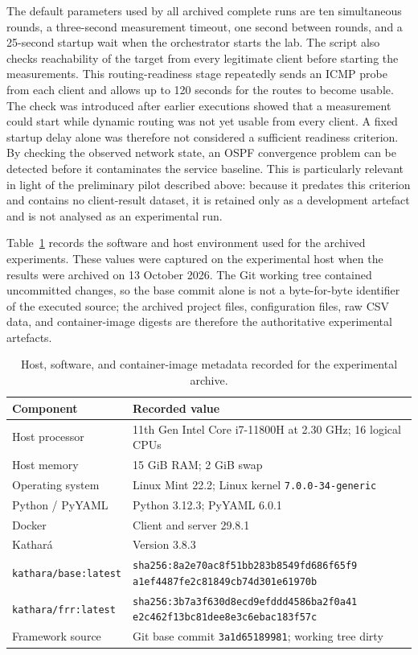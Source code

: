 The default parameters used by all archived complete runs are ten
simultaneous rounds, a three-second measurement timeout, one second between
rounds, and a 25-second startup wait when the orchestrator starts the lab. The
script also checks reachability of the target from every legitimate client
before starting the measurements. This routing-readiness stage repeatedly sends
an ICMP probe from each client and allows up to 120 seconds for the routes to
become usable. The check was introduced after earlier executions showed that a
measurement could start while dynamic routing was not yet usable from every
client. A fixed startup delay alone was therefore not considered a sufficient
readiness criterion. By checking the observed network state, an OSPF
convergence problem can be detected before it contaminates the service
baseline. This is particularly relevant in light of the preliminary
 pilot described above: because it predates
this criterion and contains no client-result dataset, it is retained only as a
development artefact and is not analysed as an experimental run.

Table~\ref{tab:experimental-environment} records the software and host
environment used for the archived experiments. These values were captured on
the experimental host when the results were archived on 13 October 2026. The
Git working tree contained uncommitted changes, so the base commit alone is not
a byte-for-byte identifier of the executed source; the archived project files,
configuration files, raw CSV data, and container-image digests are therefore
the authoritative experimental artefacts.

\begin{table}[htbp]
\centering
\small
\begin{tabular}{p{}p{}}
\toprule
\textbf{Component} & \textbf{Recorded value} \\
\midrule
Host processor & 11th Gen Intel Core i7-11800H at 2.30 GHz; 16 logical CPUs \\
Host memory & 15 GiB RAM; 2 GiB swap \\
Operating system & Linux Mint 22.2; Linux kernel \texttt{7.0.0-34-generic} \\
Python / PyYAML & Python 3.12.3; PyYAML 6.0.1 \\
Docker & Client and server 29.8.1 \\
Kathar\'a & Version 3.8.3 \\
\texttt{kathara/base:latest} &
\texttt{sha256:8a2e70ac8f51bb283b8549fd686f65f9}\allowbreak
\texttt{a1ef4487fe2c81849cb74d301e61970b} \\
\texttt{kathara/frr:latest} &
\texttt{sha256:3b7a3f630d8ecd9efddd4586ba2f0a41}\allowbreak
\texttt{e2c462f13bc81dee8e3c6ebac183f57c} \\
Framework source & Git base commit \texttt{3a1d65189981}; working tree dirty \\
\bottomrule
\end{tabular}
\caption{Host, software, and container-image metadata recorded for the
experimental archive.}
\label{tab:experimental-environment}
\end{table}

